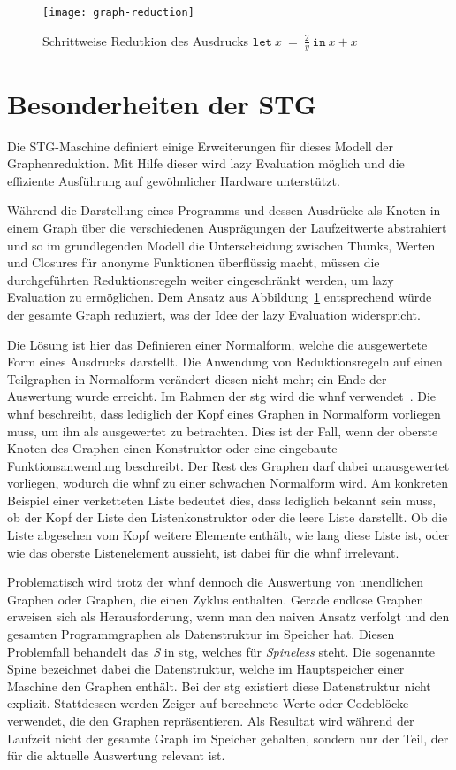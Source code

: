 \begin{figure}
  \centering
  \texttt{[image: graph-reduction]}
  \caption[Schrittweise Reduktion eines Ausdrucks]{Schrittweise Redutkion des Ausdrucks $\mathtt{let}\ x\ =\ \frac{2}{y}\ \mathtt{in}\ x + x$}\label{fig:graph-reduction}
\end{figure}


\section{Besonderheiten der STG}

Die STG-Maschine definiert einige Erweiterungen für dieses Modell der Graphenreduktion.
Mit Hilfe dieser wird lazy Evaluation möglich und die effiziente Ausführung auf gewöhnlicher Hardware unterstützt.

Während die Darstellung eines Programms und dessen Ausdrücke als Knoten in einem Graph über die verschiedenen Ausprägungen der Laufzeitwerte abstrahiert und so im grundlegenden Modell die Unterscheidung zwischen Thunks, Werten und Closures für anonyme Funktionen überflüssig macht, müssen die durchgeführten Reduktionsregeln weiter eingeschränkt werden, um lazy Evaluation zu ermöglichen.
Dem Ansatz aus Abbildung~\ref{fig:graph-reduction} entsprechend würde der gesamte Graph reduziert, was der Idee der lazy Evaluation widerspricht.

Die Lösung ist hier das Definieren einer Normalform, welche die ausgewertete Form eines Ausdrucks darstellt.
Die Anwendung von Reduktionsregeln auf einen Teilgraphen in Normalform verändert diesen nicht mehr; ein Ende der Auswertung wurde erreicht.
Im Rahmen der \gls{stg} wird die \gls{whnf} verwendet~\cite{Wiki_Haskell}.
Die \gls{whnf} beschreibt, dass lediglich der Kopf eines Graphen in Normalform vorliegen muss, um ihn als ausgewertet zu betrachten.
Dies ist der Fall, wenn der oberste Knoten des Graphen einen Konstruktor oder eine eingebaute Funktionsanwendung beschreibt.
Der Rest des Graphen darf dabei unausgewertet vorliegen, wodurch die \gls{whnf} zu einer schwachen Normalform wird.
Am konkreten Beispiel einer verketteten Liste bedeutet dies, dass lediglich bekannt sein muss, ob der Kopf der Liste den Listenkonstruktor oder die leere Liste darstellt.
Ob die Liste abgesehen vom Kopf weitere Elemente enthält, wie lang diese Liste ist, oder wie das oberste Listenelement aussieht, ist dabei für die \gls{whnf} irrelevant.

Problematisch wird trotz der \gls{whnf} dennoch die Auswertung von unendlichen Graphen oder Graphen, die einen Zyklus enthalten.
Gerade endlose Graphen erweisen sich als Herausforderung, wenn man den naiven Ansatz verfolgt und den gesamten Programmgraphen als Datenstruktur im Speicher hat.
Diesen Problemfall behandelt das \textit{S} in \gls{stg}, welches für \textit{Spineless} steht.
Die sogenannte Spine bezeichnet dabei die Datenstruktur, welche im Hauptspeicher einer Maschine den Graphen enthält.
Bei der \gls{stg} existiert diese Datenstruktur nicht explizit.
Stattdessen werden Zeiger auf berechnete Werte oder Codeblöcke verwendet, die den Graphen repräsentieren.
Als Resultat wird während der Laufzeit nicht der gesamte Graph im Speicher gehalten, sondern nur der Teil, der für die aktuelle Auswertung relevant ist.

